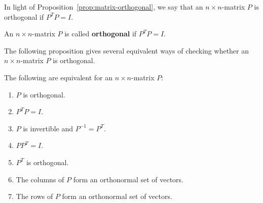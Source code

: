 \documentclass{ximera}
\begin{document}
In light of Proposition~\ref{prop:matrix-orthogonal}, we say that an
$n\times n$-matrix $P$ is orthogonal if $P^TP=I$.

\begin{definition}\label{def:orthogonal-matrix}
  An $n\times n$-matrix $P$ is called \textbf{orthogonal}%
   if $P^TP=I$.
\end{definition}

The following proposition gives several equivalent ways of checking
whether an $n\times n$-matrix $P$ is orthogonal.

\begin{proposition}\label{prop:conditions-orthogonal-matrix}
  The following are equivalent for an $n\times n$-matrix $P$:

    \begin{enumerate}
    \item $P$ is orthogonal.
    \item $P^TP=I$.
    \item $P$ is invertible and $P^{-1}=P^T$.
    \item $PP^T=I$.
    \item $P^T$ is orthogonal.
    \item The columns of $P$ form an orthonormal set of vectors.
    \item The rows of $P$ form an orthonormal set of vectors.
    \end{enumerate}

\end{proposition}
\end{document}
